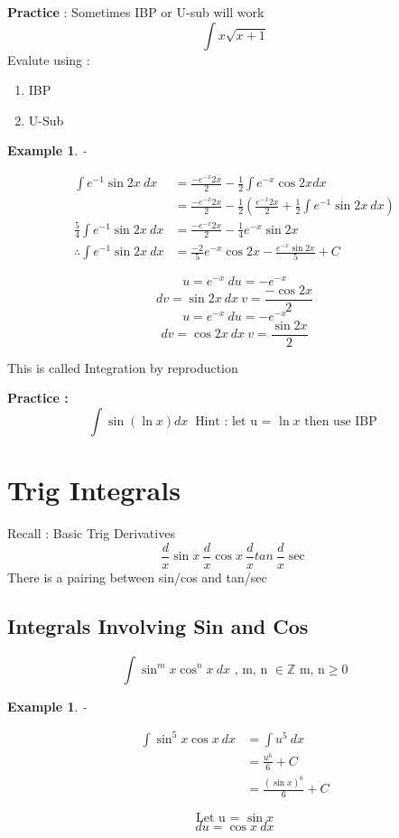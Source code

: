 \documentclass{article}
\newtheorem{ex}[theorem]{Example}
\begin{document}
\textbf{Practice} : Sometimes IBP or U-sub will work
\[ \int x \sqrt{x + 1 }\]
Evalute using : 
\begin{enumerate}
  \item IBP
  \item U-Sub
\end{enumerate}


\begin{ex} - \\
\begin{minipage}{.5\textwidth} %
$$
\begin{aligned}
\int e^{-1} \sin 2x \ dx & = \frac{-e^{-x}2x}{2} - \frac{1}{2} \int e^{-x} \cos 2x dx \\
& = \frac{-e^{-x}2x}{2} - \frac{1}{2} \left( \frac{e^{-x}2x}{2} + \frac{1}{2} \int e^{-1} \sin 2x \ dx \right) \\
\frac{5}{4} \int e^{-1} \sin 2x \ dx & =   \frac{-e^{-x}2x}{2} - \frac{1}{4} e^{-x} \sin 2x\\
\therefore \int e^{-1} \sin 2x \ dx & = \frac{-2}{5} e^{-x} \cos 2x - \frac{e^{-x} \sin 2x}{5}  +  C 
\end{aligned}
$$
\end{minipage} %
\begin{minipage}{.5\textwidth} %
$$ u = e^{-x} \ du = -e^{-x}$$
$$ dv = \sin 2x \ dx \ v = \frac{- \cos 2x}{2} $$
$$ u = e^{-x} \ du = -e^{-x}$$
$$ dv = \cos 2x \ dx \ v = \frac{ \sin 2x}{2} $$
\end{minipage}
\end{ex}
This is called Integration by reproduction 

\textbf{Practice : }
\[ \int \sin (\ln x) dx \ \text{ Hint : let u = } \ln x \text{ then use IBP } \] 



\section{Trig Integrals}
Recall : Basic Trig Derivatives \\
$$ \frac{d}{x} \sin x \ \frac{d}{x} \cos x \ \frac{d}{x} tan \ \frac{d}{x} \sec $$
There is a pairing between sin/cos and tan/sec  

\subsection{Integrals Involving Sin and Cos}
$$ \int \sin ^m x  \cos ^n x \ dx \text{ , m, n } \in \mathbb{Z} \text{ m, n} \geq 0 $$

\begin{ex} - \\
\begin{minipage}{.5\textwidth} %
$$
\begin{aligned}
\int \sin ^5 x \cos x \ dx & = \int u^5 \ dx \\
& = \frac{u^6}{6} + C \\
& = \frac{(\sin x)^6}{6} + C
\end{aligned}
$$
\end{minipage} %
\begin{minipage}{.5\textwidth} %
$$ \text{Let u = } \sin x $$
$$ du = \cos x \ dx $$
\end{minipage}
\end{ex}
\end{document}
